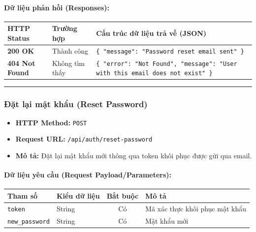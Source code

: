 \documentclass[12pt,a4paper]{article}
\begin{document}
\paragraph{Dữ liệu phản hồi (Responses):}
\begin{longtable}{|>{\raggedright\arraybackslash}p{2.8cm}|>{\raggedright\arraybackslash}p{3.2cm}|>{\raggedright\arraybackslash}p{8.0cm}|}
\hline
\textbf{HTTP Status} & \textbf{Trường hợp} & \textbf{Cấu trúc dữ liệu trả về (JSON)} \\ \hline
\endhead
\textbf{200 OK} & Thành công & \texttt{\{ "message": "Password reset email sent" \}} \\ \hline
\textbf{404 Not Found} & Không tìm thấy & \texttt{\{ "error": "Not Found", "message": "User with this email does not exist" \}} \\ \hline
\end{longtable}

\vskip 0.4cm
\noindent\rule{\textwidth}{0.3pt}
\vskip 0.4cm

\subsubsection{Đặt lại mật khẩu (Reset Password)}
\begin{itemize}[leftmargin=*]
    \item \textbf{HTTP Method:} \texttt{POST}
    \item \textbf{Request URL:} \texttt{/api/auth/reset-password}
    \item \textbf{Mô tả:} Đặt lại mật khẩu mới thông qua token khôi phục được gửi qua email.
\end{itemize}

\paragraph{Dữ liệu yêu cầu (Request Payload/Parameters):}
\begin{longtable}{|>{\raggedright\arraybackslash}p{2.8cm}|>{\raggedright\arraybackslash}p{2.2cm}|c|>{\raggedright\arraybackslash}p{7.0cm}|}
\hline
\textbf{Tham số} & \textbf{Kiểu dữ liệu} & \textbf{Bắt buộc} & \textbf{Mô tả} \\ \hline
\endhead
\texttt{token} & String & Có & Mã xác thực khôi phục mật khẩu \\ \hline
\texttt{new\_password} & String & Có & Mật khẩu mới \\ \hline
\end{longtable}
\end{document}
